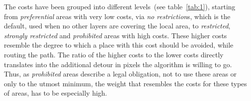 The costs have been grouped into different levels~(see table~\ref{tab:1}), starting from \textit{preferential} areas with
very low costs, via \textit{no restriction}s, which is the default, used when no other layers are covering the local area,
to \textit{restricted}, \textit{strongly restricted} and \textit{prohibited} areas with high costs.
These higher costs resemble the degree to which a place with this cost should be avoided, while routing the path.
The ratio of the higher costs to the lower costs directly translates into the additional detour in pixels
the algorithm is willing to go.
Thus, as \textit{prohibited} areas describe a legal obligation, not to use these areas or only to the utmost minimum,
the weight that resembles the costs for these types of areas, has to be especially high.\\

